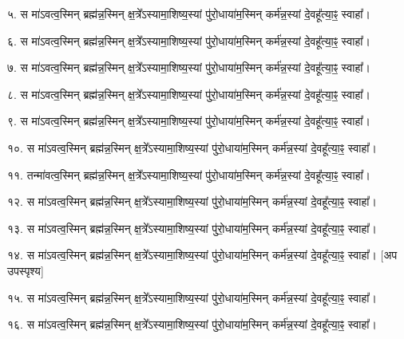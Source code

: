 ५.  स मा॑ऽवत्व॒स्मिन् ब्रह्म॑न्न॒स्मिन् क्ष॒त्रे᳚ऽस्यामा॒शिष्य॒स्यां पु॑रो॒धाया॑म॒स्मिन् कर्म॑न्न॒स्यां दे॒वहू᳚त्या॒ꣴ॒ स्वाहा᳚।

६.  स मा॑ऽवत्व॒स्मिन् ब्रह्म॑न्न॒स्मिन् क्ष॒त्रे᳚ऽस्यामा॒शिष्य॒स्यां पु॑रो॒धाया॑म॒स्मिन् कर्म॑न्न॒स्यां दे॒वहू᳚त्या॒ꣴ॒ स्वाहा᳚।

७.  स मा॑ऽवत्व॒स्मिन् ब्रह्म॑न्न॒स्मिन् क्ष॒त्रे᳚ऽस्यामा॒शिष्य॒स्यां पु॑रो॒धाया॑म॒स्मिन् कर्म॑न्न॒स्यां दे॒वहू᳚त्या॒ꣴ॒ स्वाहा᳚।

८.  स मा॑ऽवत्व॒स्मिन् ब्रह्म॑न्न॒स्मिन् क्ष॒त्रे᳚ऽस्यामा॒शिष्य॒स्यां पु॑रो॒धाया॑म॒स्मिन् कर्म॑न्न॒स्यां दे॒वहू᳚त्या॒ꣴ॒ स्वाहा᳚।

९.  स मा॑ऽवत्व॒स्मिन् ब्रह्म॑न्न॒स्मिन् क्ष॒त्रे᳚ऽस्यामा॒शिष्य॒स्यां पु॑रो॒धाया॑म॒स्मिन् कर्म॑न्न॒स्यां दे॒वहू᳚त्या॒ꣴ॒ स्वाहा᳚।

१०.  स मा॑ऽवत्व॒स्मिन् ब्रह्म॑न्न॒स्मिन् क्ष॒त्रे᳚ऽस्यामा॒शिष्य॒स्यां पु॑रो॒धाया॑म॒स्मिन् कर्म॑न्न॒स्यां दे॒वहू᳚त्या॒ꣴ॒ स्वाहा᳚।

११.  तन्मा॑वत्व॒स्मिन् ब्रह्म॑न्न॒स्मिन् क्ष॒त्रे᳚ऽस्यामा॒शिष्य॒स्यां पु॑रो॒धाया॑म॒स्मिन् कर्म॑न्न॒स्यां दे॒वहू᳚त्या॒ꣴ॒ स्वाहा᳚।

१२.  स मा॑ऽवत्व॒स्मिन् ब्रह्म॑न्न॒स्मिन् क्ष॒त्रे᳚ऽस्यामा॒शिष्य॒स्यां पु॑रो॒धाया॑म॒स्मिन् कर्म॑न्न॒स्यां दे॒वहू᳚त्या॒ꣴ॒ स्वाहा᳚।

१३.  स मा॑ऽवत्व॒स्मिन् ब्रह्म॑न्न॒स्मिन् क्ष॒त्रे᳚ऽस्यामा॒शिष्य॒स्यां पु॑रो॒धाया॑म॒स्मिन् कर्म॑न्न॒स्यां दे॒वहू᳚त्या॒ꣴ॒ स्वाहा᳚।

१४.  स मा॑ऽवत्व॒स्मिन् ब्रह्म॑न्न॒स्मिन् क्ष॒त्रे᳚ऽस्यामा॒शिष्य॒स्यां पु॑रो॒धाया॑म॒स्मिन् कर्म॑न्न॒स्यां दे॒वहू᳚त्या॒ꣴ॒ स्वाहा᳚।
[अप उपस्पृश्य]

१५.  स मा॑ऽवत्व॒स्मिन् ब्रह्म॑न्न॒स्मिन् क्ष॒त्रे᳚ऽस्यामा॒शिष्य॒स्यां पु॑रो॒धाया॑म॒स्मिन् कर्म॑न्न॒स्यां दे॒वहू᳚त्या॒ꣴ॒ स्वाहा᳚।

१६.  स मा॑ऽवत्व॒स्मिन् ब्रह्म॑न्न॒स्मिन् क्ष॒त्रे᳚ऽस्यामा॒शिष्य॒स्यां पु॑रो॒धाया॑म॒स्मिन् कर्म॑न्न॒स्यां दे॒वहू᳚त्या॒ꣴ॒ स्वाहा᳚।

